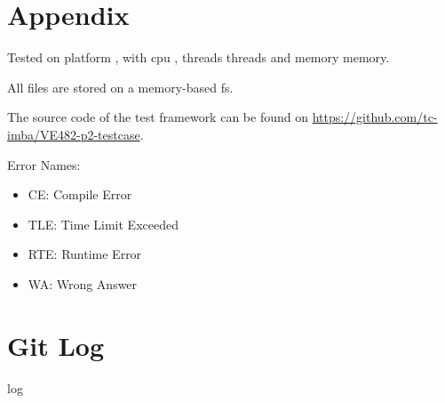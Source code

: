 \documentclass[landscape]{article}
\begin{document}
\newpage

\section*{Appendix}

Tested on {{ platform }}, with {{ cpu }}, {{ threads }} threads and {{ memory }} memory.

All files are stored on a memory-based fs.

The source code of the test framework can be found on \url{https://github.com/tc-imba/VE482-p2-testcase}. \bigskip

Error Names:
\begin{itemize}
\item {\color{red}CE}: Compile Error
\item {\color{red}TLE}: Time Limit Exceeded
\item {\color{red}RTE}: Runtime Error
\item {\color{red}WA}: Wrong Answer
\end{itemize}

\section*{Git Log}

\begin{multicols}{2}
{{ log }}
\end{multicols}
\end{document}
